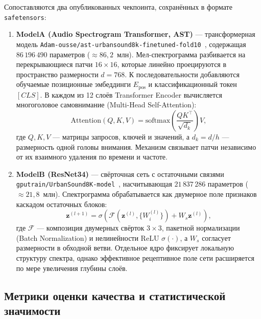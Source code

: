 \documentclass[pdflatex,sn-mathphys-num]{sn-jnl}
\begin{document}
Сопоставляются два опубликованных чекпоинта, сохранённых в формате \texttt{safetensors}:
\begin{enumerate}
    \item \textbf{ModelA (Audio Spectrogram Transformer, AST)} --- трансформерная модель \texttt{Adam-ousse/ast-urbansound8k-finetuned-fold10}~\cite{ref5,ref14}, содержащая $86\,196\,490$ параметров ($\approx 86{,}2$~млн). Мел-спектрограмма разбивается на перекрывающиеся патчи $16 \times 16$, которые линейно проецируются в пространство размерности $d = 768$. К последовательности добавляются обучаемые позиционные эмбеддинги $E_{\text{pos}}$ и классификационный токен $[CLS]$. В каждом из 12 слоёв Transformer Encoder вычисляется многоголовое самовнимание (Multi-Head Self-Attention):
    \begin{equation}\label{eq:attention}
        \text{Attention}(Q, K, V) = \text{softmax}\!\left(\frac{QK^{\top}}{\sqrt{d_k}}\right)V,
    \end{equation}
    где $Q, K, V$ --- матрицы запросов, ключей и значений, а $d_k = d / h$ --- размерность одной головы внимания. Механизм связывает патчи независимо от их взаимного удаления по времени и частоте.
    \item \textbf{ModelB (ResNet34)} --- свёрточная сеть с остаточными связями \texttt{gputrain/UrbanSound8K-model}~\cite{ref15}, насчитывающая $21\,837\,286$ параметров ($\approx 21{,}8$~млн). Спектрограмма обрабатывается как двумерное поле признаков каскадом остаточных блоков:
    \begin{equation}\label{eq:resnet}
        \mathbf{z}^{(l+1)} = \sigma\!\left(\mathcal{F}\!\left(\mathbf{z}^{(l)}, \{W_i^{(l)}\}\right) + W_s \mathbf{z}^{(l)}\right),
    \end{equation}
    где $\mathcal{F}$ --- композиция двумерных свёрток $3 \times 3$, пакетной нормализации (Batch Normalization) и нелинейности ReLU $\sigma(\cdot)$, а $W_s$ согласует размерности в обходной ветви. Отдельное ядро фиксирует локальную структуру спектра, однако эффективное рецептивное поле сети расширяется по мере увеличения глубины слоёв.
\end{enumerate}

\subsection{Метрики оценки качества и статистической значимости}
\end{document}
